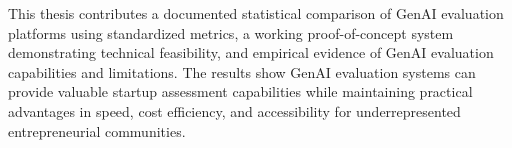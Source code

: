 This thesis contributes a documented statistical comparison of GenAI evaluation platforms using standardized metrics, a working proof-of-concept system demonstrating technical feasibility, and empirical evidence of GenAI evaluation capabilities and limitations. The results show GenAI evaluation systems can provide valuable startup assessment capabilities while maintaining practical advantages in speed, cost efficiency, and accessibility for underrepresented entrepreneurial communities.